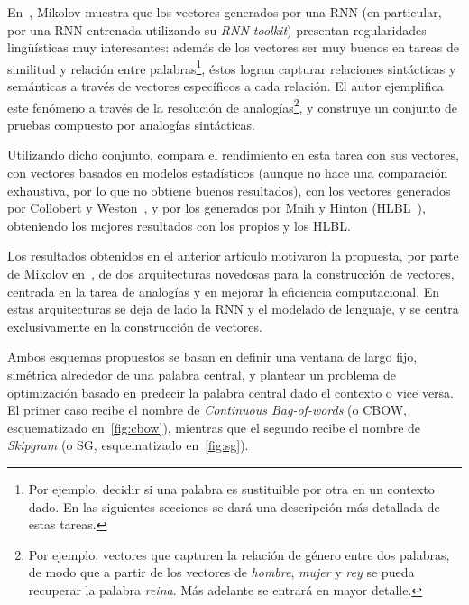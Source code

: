 En~\cite{Mikolov2013a}, Mikolov muestra que los vectores generados por una RNN (en particular, por
una RNN entrenada utilizando su \textit{RNN toolkit}) presentan regularidades lingüísticas muy
interesantes: además de los vectores ser muy buenos en tareas de similitud y relación entre
palabras\footnote{Por ejemplo, decidir si una palabra es sustituible por otra en un contexto
dado. En las siguientes secciones se dará una descripción más detallada de estas tareas.}, éstos
logran capturar relaciones sintácticas y semánticas a través de vectores específicos a cada
relación. El autor ejemplifica este fenómeno a través de la resolución de analogías\footnote{Por
ejemplo, vectores que capturen la relación de género entre dos palabras, de modo que a partir de los
vectores de \textit{hombre}, \textit{mujer} y \textit{rey} se pueda recuperar la palabra
\textit{reina}. Más adelante se entrará en mayor detalle.}, y construye un conjunto de pruebas
compuesto por analogías sintácticas.

Utilizando dicho conjunto, compara el rendimiento en esta tarea con sus vectores, con vectores
basados en modelos estadísticos (aunque no hace una comparación exhaustiva, por lo que no obtiene
buenos resultados), con los vectores generados por Collobert y Weston~\cite{CollobertWeston2008}, y
por los generados por Mnih y Hinton (HLBL~\cite{MnihHinton2009}), obteniendo los mejores resultados
con los propios y los HLBL\@.

Los resultados obtenidos en el anterior artículo motivaron la propuesta, por parte de Mikolov
en~\cite{Mikolov2013b}, de dos arquitecturas novedosas para la construcción de vectores, centrada en
la tarea de analogías y en mejorar la eficiencia computacional. En estas arquitecturas se deja de
lado la RNN y el modelado de lenguaje, y se centra exclusivamente en la construcción de vectores.

Ambos esquemas propuestos se basan en definir una ventana de largo fijo, simétrica alrededor de una
palabra central, y plantear un problema de optimización basado en predecir la palabra central dado
el contexto o vice versa. El primer caso recibe el nombre de \textit{Continuous Bag-of-words} (o
CBOW, esquematizado en~\ref{fig:cbow}), mientras que el segundo recibe el nombre de
\textit{Skipgram} (o SG, esquematizado en~\ref{fig:sg}).

